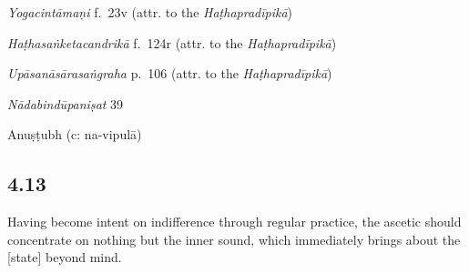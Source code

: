 \begin{ekdosis}

\begin{testimonia}[hp04_012]
\emph{Yogacintāmaṇi} f.~23v (attr. to the \emph{Haṭhapradīpikā})
\begin{versinnote}
\end{versinnote}

\emph{Haṭhasaṅketacandrikā} f.~124r (attr. to the \emph{Haṭhapradīpikā})
\begin{versinnote}
\end{versinnote}

\emph{Upāsanāsārasaṅgraha} p.~106 (attr. to the \emph{Haṭhapradīpikā})
\begin{versinnote}
\end{versinnote}

\emph{Nādabindūpaniṣat} 39
\begin{versinnote}
\end{versinnote}
\end{testimonia}


\begin{metre}[hp04_012]
Anuṣṭubh (c: na-vipulā)
\end{metre}

\subsection*{4.13}
\begin{translation}[hp04_013]
Having become intent on indifference through regular practice, the ascetic should concentrate on nothing but the inner sound, which immediately brings about the [state] beyond mind.%
\end{translation}


\end{ekdosis}
